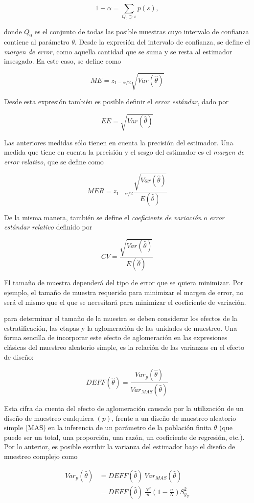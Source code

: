 \documentclass[
  12pt,
]{book}
\begin{document}
\[
1-\alpha=\sum_{Q_0 \supset s}p(s),
\]

donde \(Q_0\) es el conjunto de todas las posible muestras cuyo intervalo de confianza contiene al parámetro \(\theta\). Desde la expresión del intervalo de confianza, se define el \emph{margen de error}, como aquella cantidad que se suma y se resta al estimador insesgado. En este caso, se define como

\[
ME = z_{1-\alpha / 2}\sqrt{ Var(\hat{\theta})}
\]

Desde esta expresión también es posible definir el \emph{error estándar}, dado por

\[
EE = \sqrt{ Var(\hat{\theta})}
\]

Las anteriores medidas sólo tienen en cuenta la precisión del estimador. Una medida que tiene en cuenta la precisión y el sesgo del estimador es el \emph{margen de error relativo}, que se define como

\[
MER = z_{1-\alpha / 2}\frac{\sqrt{ Var(\hat{\theta})}}{E(\hat{\theta})}
\]

De la misma manera, también se define el \emph{coeficiente de variación} o \emph{error estándar relativo} definido por

\[
CV =  \frac{\sqrt{ Var(\hat{\theta})}}{E(\hat{\theta})}
\]

El tamaño de muestra dependerá del tipo de error que se quiera minimizar. Por ejemplo, el tamaño de muestra requerido para minimizar el margen de error, no será el mismo que el que se necesitará para minimizar el coeficiente de variación.

para determinar el tamaño de la muestra se deben considerar los efectos de la estratificación, las etapas y la aglomeración de las unidades de muestreo. Una forma sencilla de incorporar este efecto de aglomeración en las expresiones clásicas del muestreo aleatorio simple, es la relación de las varianzas en el efecto de diseño:

\[
DEFF(\hat{\theta})=\frac{Var_p(\hat{\theta})}{Var_{MAS}(\hat{\theta})}
\]

Esta cifra da cuenta del efecto de aglomeración causado por la utilización de un diseño de muestreo cualquiera \((p)\), frente a un diseño de muestreo aleatorio simple (MAS) en la inferencia de un parámetro de la población finita \(\theta\) (que puede ser un total, una proporción, una razón, un coeficiente de regresión, etc.). Por lo anterior, es posible escribir la varianza del estimador bajo el diseño de muestreo complejo como

\begin{align}
Var_p(\hat{\theta}) & = DEFF(\hat{\theta}) \ Var_{MAS}(\hat{\theta}) \\
& = DEFF(\hat{\theta}) \ \frac{N^2}{n}\left(1-\frac{n}{N}\right)S^2_{y_U}
\end{align}
\end{document}
